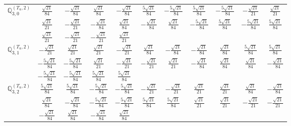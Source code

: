 \documentclass[fleqn,10pt,landscape]{article}
\begin{document}
\begin{itemize}
{\begin{center}
\begin{longtable}{ccccccccccc}
$\mathbb{Q}_{3,0}^{(T_{u},2)}$ & $ \frac{\sqrt{21}}{84} $ & $ - \frac{\sqrt{21}}{84} $ & $ \frac{\sqrt{21}}{84} $ & $ - \frac{\sqrt{21}}{84} $ & $ \frac{5 \sqrt{21}}{84} $ & $ - \frac{5 \sqrt{21}}{84} $ & $ \frac{5 \sqrt{21}}{84} $ & $ - \frac{5 \sqrt{21}}{84} $ & $ - \frac{\sqrt{21}}{21} $ & $ \frac{\sqrt{21}}{21} $ \\
& $ \frac{\sqrt{21}}{21} $ & $ - \frac{\sqrt{21}}{21} $ & $ - \frac{\sqrt{21}}{84} $ & $ \frac{\sqrt{21}}{84} $ & $ - \frac{\sqrt{21}}{84} $ & $ \frac{\sqrt{21}}{84} $ & $ - \frac{5 \sqrt{21}}{84} $ & $ \frac{5 \sqrt{21}}{84} $ & $ - \frac{5 \sqrt{21}}{84} $ & $ \frac{5 \sqrt{21}}{84} $ \\
& $ \frac{\sqrt{21}}{21} $ & $ - \frac{\sqrt{21}}{21} $ & $ - \frac{\sqrt{21}}{21} $ & $ \frac{\sqrt{21}}{21} $ & $  $ & $  $ & $  $ & $  $ & $  $ & $  $ \\ \hline
$\mathbb{Q}_{3,1}^{(T_{u},2)}$ & $ - \frac{\sqrt{21}}{21} $ & $ \frac{\sqrt{21}}{21} $ & $ \frac{\sqrt{21}}{21} $ & $ - \frac{\sqrt{21}}{21} $ & $ \frac{\sqrt{21}}{84} $ & $ - \frac{\sqrt{21}}{84} $ & $ - \frac{\sqrt{21}}{84} $ & $ \frac{\sqrt{21}}{84} $ & $ \frac{5 \sqrt{21}}{84} $ & $ \frac{5 \sqrt{21}}{84} $ \\
& $ - \frac{5 \sqrt{21}}{84} $ & $ - \frac{5 \sqrt{21}}{84} $ & $ \frac{\sqrt{21}}{21} $ & $ - \frac{\sqrt{21}}{21} $ & $ - \frac{\sqrt{21}}{21} $ & $ \frac{\sqrt{21}}{21} $ & $ - \frac{\sqrt{21}}{84} $ & $ \frac{\sqrt{21}}{84} $ & $ \frac{\sqrt{21}}{84} $ & $ - \frac{\sqrt{21}}{84} $ \\
& $ - \frac{5 \sqrt{21}}{84} $ & $ - \frac{5 \sqrt{21}}{84} $ & $ \frac{5 \sqrt{21}}{84} $ & $ \frac{5 \sqrt{21}}{84} $ & $  $ & $  $ & $  $ & $  $ & $  $ & $  $ \\ \hline
$\mathbb{Q}_{3,2}^{(T_{u},2)}$ & $ \frac{5 \sqrt{21}}{84} $ & $ \frac{5 \sqrt{21}}{84} $ & $ - \frac{5 \sqrt{21}}{84} $ & $ - \frac{5 \sqrt{21}}{84} $ & $ - \frac{\sqrt{21}}{21} $ & $ - \frac{\sqrt{21}}{21} $ & $ \frac{\sqrt{21}}{21} $ & $ \frac{\sqrt{21}}{21} $ & $ \frac{\sqrt{21}}{84} $ & $ - \frac{\sqrt{21}}{84} $ \\
& $ \frac{\sqrt{21}}{84} $ & $ - \frac{\sqrt{21}}{84} $ & $ - \frac{5 \sqrt{21}}{84} $ & $ - \frac{5 \sqrt{21}}{84} $ & $ \frac{5 \sqrt{21}}{84} $ & $ \frac{5 \sqrt{21}}{84} $ & $ \frac{\sqrt{21}}{21} $ & $ \frac{\sqrt{21}}{21} $ & $ - \frac{\sqrt{21}}{21} $ & $ - \frac{\sqrt{21}}{21} $ \\
& $ - \frac{\sqrt{21}}{84} $ & $ \frac{\sqrt{21}}{84} $ & $ - \frac{\sqrt{21}}{84} $ & $ \frac{\sqrt{21}}{84} $ & $  $ & $  $ & $  $ & $  $ & $  $ & $  $ \\ \hline

\end{longtable}
\end{center}}
\end{itemize}
\end{document}
